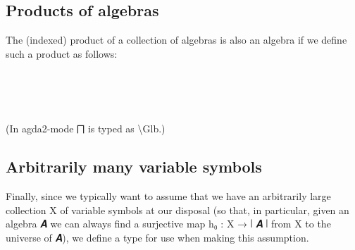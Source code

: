 \documentclass[sigplan,screen]{acmart}
\begin{document}
\subsection{Products of algebras}
The (indexed) product of a collection of algebras is also an algebra if we define such a product as follows:
\begin{code}%
%
\>[1]\AgdaSpace{}%
\AgdaSymbol{:}\AgdaSpace{}%
\AgdaSymbol{\{}\AgdaSpace{}%
\AgdaSymbol{:}\AgdaSpace{}%
\AgdaSpace{}%
\AgdaSpace{}%
\AgdaSymbol{\}(}\AgdaSpace{}%
\AgdaSymbol{:}\AgdaSpace{}%
\AgdaSpace{}%
\AgdaSpace{}%
\AgdaSpace{}%
\AgdaSpace{}%
\AgdaSpace{}%
\AgdaSymbol{)}\AgdaSpace{}%
\AgdaSpace{}%
\AgdaSpace{}%
\AgdaSymbol{(}\AgdaSpace{}%
\AgdaSpace{}%
\AgdaSymbol{)}\AgdaSpace{}%
\<%
\\
%
\>[1]\AgdaSpace{}%
\AgdaSpace{}%
\AgdaSymbol{=}%
\>[8]\AgdaSymbol{((}\AgdaSpace{}%
\AgdaSymbol{:}\AgdaSpace{}%
\AgdaSymbol{\AgdaUnderscore{})}\AgdaSpace{}%
\AgdaSpace{}%
\AgdaSpace{}%
\AgdaSpace{}%
\AgdaSpace{}%
\AgdaSymbol{)}\AgdaSpace{}%
\AgdaOperator{\AgdaInductiveConstructor{,}}%
\>[31]\AgdaSpace{}%
\AgdaSpace{}%
\AgdaSpace{}%
\AgdaSpace{}%
\AgdaSpace{}%
\AgdaSymbol{(}\AgdaSpace{}%
\AgdaSpace{}%
\AgdaSpace{}%
\AgdaSymbol{)}\AgdaSpace{}%
\AgdaSpace{}%
\AgdaSpace{}%
\AgdaSpace{}%
\AgdaSpace{}%
\AgdaSpace{}%
\<%
\\
%
\\[\AgdaEmptyExtraSkip]%
%
\>[1]\AgdaSpace{}%
\AgdaSpace{}%
\<%
\end{code}
(In agda2-mode ⨅ is typed as \textbackslash Glb.)

\subsection{Arbitrarily many variable symbols}

Finally, since we typically want to assume that we have an arbitrarily large collection X of variable symbols at our disposal (so that, in particular, given an algebra 𝑨 we can always find a surjective map h₀ : X → ∣ 𝑨 ∣ from X to the universe of 𝑨), we define a type for use when making this assumption.
\end{document}
